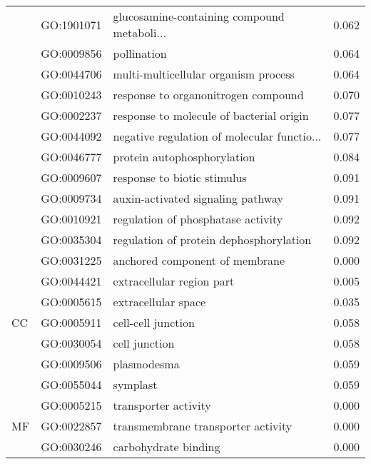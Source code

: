 \begin{longtable}{lllr}
   & GO:1901071 &  glucosamine-containing compound metaboli... &         0.062 \\
   & GO:0009856 &                                  pollination &         0.064 \\
   & GO:0044706 &         multi-multicellular organism process &         0.064 \\
   & GO:0010243 &          response to organonitrogen compound &         0.070 \\
   & GO:0002237 &     response to molecule of bacterial origin &         0.077 \\
   & GO:0044092 &  negative regulation of molecular functio... &         0.077 \\
   & GO:0046777 &                  protein autophosphorylation &         0.084 \\
   & GO:0009607 &                  response to biotic stimulus &         0.091 \\
   & GO:0009734 &            auxin-activated signaling pathway &         0.091 \\
   & GO:0010921 &           regulation of phosphatase activity &         0.092 \\
   & GO:0035304 &      regulation of protein dephosphorylation &         0.092 \\
\cline{1-4}
\multirow{7}{*}{CC} & GO:0031225 &               anchored component of membrane &         0.000 \\
   & GO:0044421 &                    extracellular region part &         0.005 \\
   & GO:0005615 &                          extracellular space &         0.035 \\
   & GO:0005911 &                           cell-cell junction &         0.058 \\
   & GO:0030054 &                                cell junction &         0.058 \\
   & GO:0009506 &                                  plasmodesma &         0.059 \\
   & GO:0055044 &                                     symplast &         0.059 \\
\cline{1-4}
\multirow{78}{*}{MF} & GO:0005215 &                         transporter activity &         0.000 \\
   & GO:0022857 &           transmembrane transporter activity &         0.000 \\
   & GO:0030246 &                         carbohydrate binding &         0.000 \\

\end{longtable}
